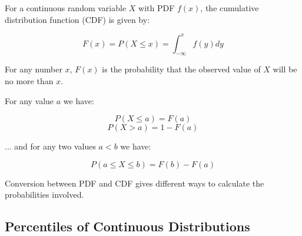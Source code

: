For a continuous random variable $X$ with PDF $f(x)$, the cumulative distribution function (CDF) is given by:

$$ F(x) = P(X \leq x) = \int_{-\infty}^x f(y) dy $$

For any number $x$, $F(x)$ is the probability that the observed value of $X$ will be no more than $x$.

For any value $a$ we have:

$$ P(X \leq a) = F(a) $$
$$ P(X > a) = 1 - F(a) $$

... and for any two values $a < b$ we have:

$$ P(a \leq X \leq b) = F(b) - F(a) $$

Conversion between PDF and CDF gives different ways to calculate the probabilities involved.

\subsection*{Percentiles of Continuous Distributions}


